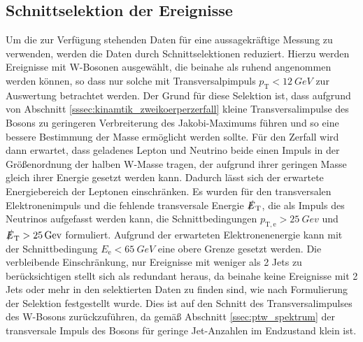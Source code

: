 \documentclass[11pt, a4paper]{article}
\numberwithin{equation}{section}
\begin{document}
\subsection{Schnittselektion der Ereignisse}
\label{ssec:schnittselektion}
Um die zur Verfügung stehenden Daten für eine aussagekräftige Messung zu verwenden, werden die Daten durch Schnittselektionen reduziert.
Hierzu werden Ereignisse mit W-Bosonen ausgewählt, die beinahe als ruhend angenommen werden können, so dass nur solche mit Transversalpimpuls $p_\mathrm{T}<\SI{12}{GeV}$ zur Auswertung betrachtet werden.
Der Grund für diese Selektion ist, dass aufgrund von Abschnitt \ref{sssec:kinamtik_zweikoerperzerfall} kleine Transversalimpulse des Bosons zu geringeren Verbreiterung des Jakobi-Maximums führen und so eine bessere Bestimmung der Masse ermöglicht werden sollte.
Für den Zerfall wird dann erwartet, dass geladenes Lepton und Neutrino beide einen Impuls in der Größenordnung der halben W-Masse tragen, der aufgrund ihrer geringen Masse gleich ihrer Energie gesetzt werden kann.
Dadurch lässt sich der erwartete Energiebereich der Leptonen einschränken.
Es wurden für den transversalen Elektronenimpuls und die fehlende transversale Energie $\slashed{E}_\mathrm{T}$, die als Impuls des Neutrinos aufgefasst werden kann, die Schnittbedingungen $p_\mathrm{T,e}>\SI{25}{Gev}$ und $\slashed{E}_\mathrm{T}>\SI{25}{Gev}$ formuliert.
Aufgrund der erwarteten Elektronenenergie kann mit der Schnittbedingung $E_\mathrm{e}<\SI{65}{GeV}$ eine obere Grenze gesetzt werden.
Die verbleibende Einschränkung, nur Ereignisse mit weniger als \num{2} Jets zu berücksichtigen stellt sich als redundant heraus, da beinahe keine Ereignisse mit \num{2} Jets oder mehr in den selektierten Daten zu finden sind, wie nach Formulierung der Selektion festgestellt wurde.
Dies ist auf den Schnitt des Transversalimpulses des W-Bosons zurückzuführen, da gemäß Abschnitt \ref{ssec:ptw_spektrum} der transversale Impuls des Bosons für geringe Jet-Anzahlen im Endzustand klein ist.
\end{document}
